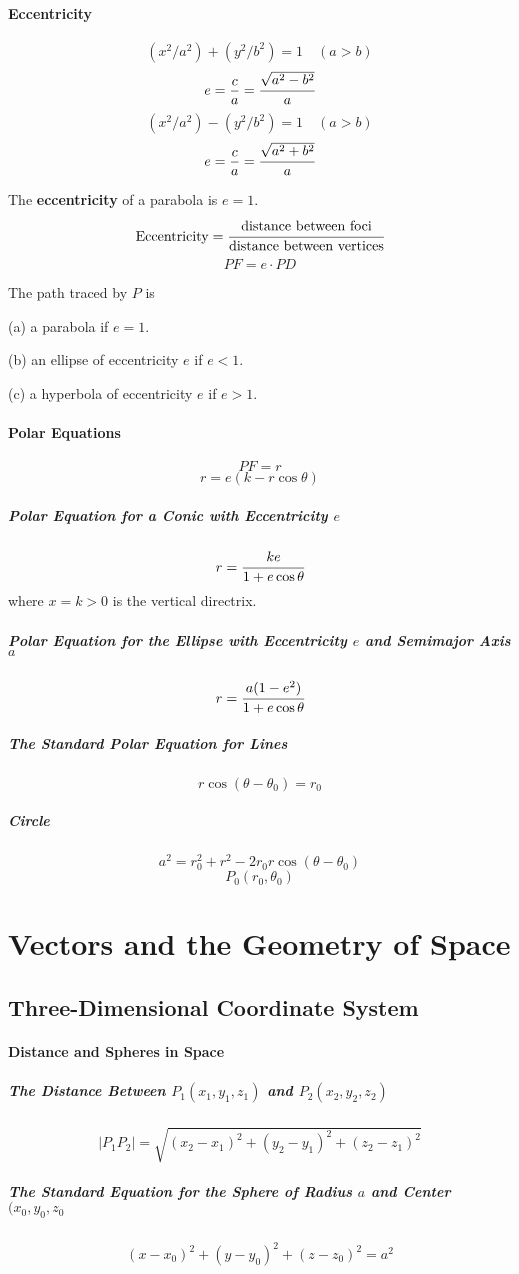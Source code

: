 \documentclass{article}
\begin{document}
            \paragraph{Eccentricity}
                \[(x^2/a^2)+(y^2/b^2)=1\quad(a>b)\]
                \[e=\frac{c}{a}=\cfrac{\sqrt{a^2-b^2}}{a}\]
                \newline
                \[(x^2/a^2)-(y^2/b^2)=1\quad(a>b)\]
                \[e=\frac{c}{a}=\cfrac{\sqrt{a^2+b^2}}{a}\]
                \par The \textbf{eccentricity} of a parabola is $e=1$.
                \[\text{Eccentricity}=\cfrac{\text{distance between foci}}{\text{distance between vertices}}\]
                \[PF=e\cdot PD\]
                \par The path traced by $P$ is
                \par (a) a parabola if $e=1$.
                \par (b) an ellipse of eccentricity $e$ if $e<1$.
                \par (c) a hyperbola of eccentricity $e$ if $e>1$.
            \paragraph{Polar Equations}
                \[PF=r\]
                \[r=e(k-r\cos\theta)\]
                \subparagraph{Polar Equation for a Conic with Eccentricity $e$}
                    \[r=\cfrac{ke}{1+e\cos\theta}\]
                    where $x=k>0$ is the vertical directrix. 
                \subparagraph{Polar Equation for the Ellipse with Eccentricity $e$ and Semimajor Axis $a$}
                    \[r=\cfrac{a(1-e^2)}{1+e\cos\theta}\]
                \subparagraph{The Standard Polar Equation for Lines}
                    \[r\cos(\theta-\theta_0)=r_0\]
                \subparagraph{Circle}
                    \[a^2=r_0^2+r^2-2r_0r\cos(\theta-\theta_0)\]
                    \[P_0(r_0,\theta_0)\]
        
    \newpage
    \section{Vectors and the Geometry of Space}
        \subsection{Three-Dimensional Coordinate System}
            \paragraph{Distance and Spheres in Space}
                \subparagraph{The Distance Between $P_1(x_1,y_1,z_1)$ and $P_2(x_2,y_2,z_2)$}
                \[|P_1P_2|=\sqrt{(x_2-x_1)^2+(y_2-y_1)^2+(z_2-z_1)^2}\]
                \subparagraph{The Standard Equation for the Sphere of Radius $a$ and Center $(x_0,y_0,z_0$}
                \[(x-x_0)^2+(y-y_0)^2+(z-z_0)^2=a^2\]
\end{document}
